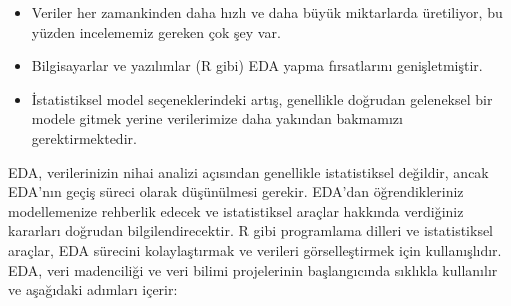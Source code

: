 \documentclass[
  letterpaper,
  DIV=11,
  numbers=noendperiod]{scrreprt}
\begin{document}
\begin{itemize}
\item
  Veriler her zamankinden daha hızlı ve daha büyük miktarlarda
  üretiliyor, bu yüzden incelememiz gereken çok şey var.
\item
  Bilgisayarlar ve yazılımlar (R gibi) EDA yapma fırsatlarını
  genişletmiştir.
\item
  İstatistiksel model seçeneklerindeki artış, genellikle doğrudan
  geleneksel bir modele gitmek yerine verilerimize daha yakından
  bakmamızı gerektirmektedir.
\end{itemize}

EDA, verilerinizin nihai analizi açısından genellikle istatistiksel
değildir, ancak EDA'nın geçiş süreci olarak düşünülmesi gerekir. EDA'dan
öğrendikleriniz modellemenize rehberlik edecek ve istatistiksel araçlar
hakkında verdiğiniz kararları doğrudan bilgilendirecektir. R gibi
programlama dilleri ve istatistiksel araçlar, EDA sürecini
kolaylaştırmak ve verileri görselleştirmek için kullanışlıdır. EDA, veri
madenciliği ve veri bilimi projelerinin başlangıcında sıklıkla
kullanılır ve aşağıdaki adımları içerir:
\end{document}
